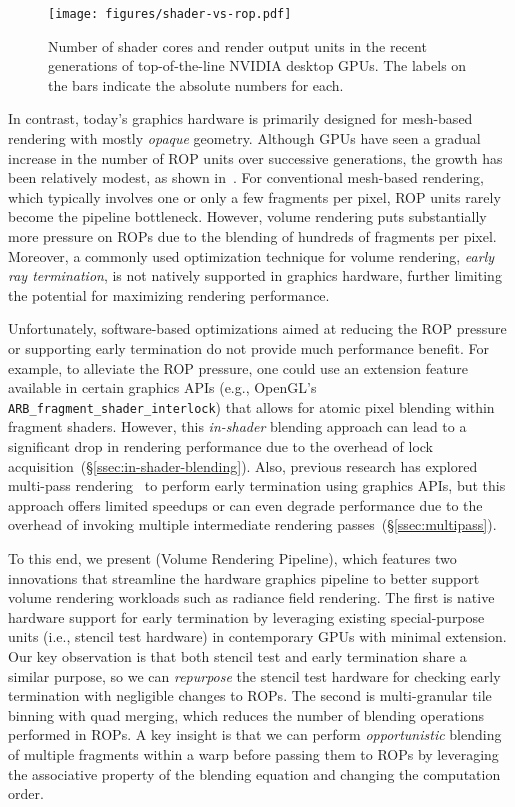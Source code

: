 \begin{figure}[t]
  \centering
  \texttt{[image: figures/shader-vs-rop.pdf]}
  \caption{Number of shader cores and render output units in the recent generations of top-of-the-line NVIDIA desktop GPUs. 
  The labels on the bars indicate the absolute numbers for each.
  }
  \vspace{-0.20in}
  \label{fig:shader-vs-rop}
\end{figure}

In contrast, today's graphics hardware is primarily designed for mesh-based
rendering with mostly \emph{opaque} geometry. Although GPUs have seen a gradual
increase in the number of ROP units over successive generations, the growth has
been relatively modest, as shown in~. 
%
For conventional mesh-based rendering, which typically involves one or only a
few fragments per pixel, ROP units rarely become the pipeline bottleneck.
However, volume rendering puts substantially more pressure on ROPs due to the
blending of hundreds of fragments per pixel.
%
Moreover, a commonly used optimization technique for volume rendering,
\emph{early ray termination}, is not natively supported in graphics hardware,
further limiting the potential for maximizing rendering performance.

Unfortunately, software-based optimizations aimed at reducing the ROP pressure
or supporting early termination do not provide much performance benefit.
%
For example, to alleviate the ROP pressure, one could use an extension feature
available in certain graphics APIs (e.g., OpenGL's \texttt{\small
ARB\_fragment\_shader\_interlock}) that allows for atomic pixel blending within
fragment shaders. However, this \emph{in-shader} blending approach can lead to
a significant drop in rendering performance due to the overhead of lock
acquisition~(\S\ref{ssec:in-shader-blending}).
%
Also, previous research has explored multi-pass rendering~\cite{kru:wes03} to
perform early termination using graphics APIs, but this approach offers limited
speedups or can even degrade performance due to the overhead of invoking
multiple intermediate rendering passes~(\S\ref{ssec:multipass}).

To this end, we present \name{} (Volume Rendering Pipeline), which features two
innovations that streamline the hardware graphics pipeline to better support
volume rendering workloads such as radiance field rendering.
%
The first is native hardware support for early termination by leveraging
existing special-purpose units (i.e., stencil test hardware) in contemporary
GPUs with minimal extension.
%
Our key observation is that both stencil test and early termination share
a similar purpose, so we can \emph{repurpose} the stencil test hardware for
checking early termination with negligible changes to ROPs.
%
The second is multi-granular tile binning with quad merging, which reduces the
number of blending operations performed in ROPs.
%
A key insight is that we can perform \emph{opportunistic} blending of
multiple fragments within a warp before passing them to ROPs by leveraging the
associative property of the blending equation and changing the computation
order.

